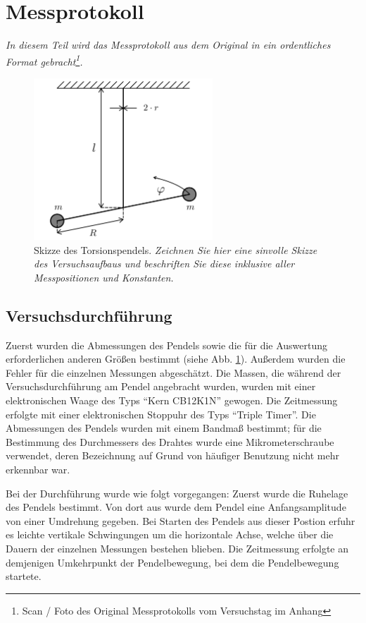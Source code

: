 \section{Messprotokoll}
\textsl{In diesem Teil wird das Messprotokoll aus dem Original in ein ordentliches Format gebracht\footnote{Scan / Foto des Original Messprotokolls vom Versuchstag im Anhang}.}

\begin{figure}
    \centering
    \includegraphics[width=0.6\textwidth]{plots/skizze.png}
    \caption{Skizze des Torsionspendels. \textsl{Zeichnen Sie hier eine sinvolle Skizze des Versuchsaufbaus und beschriften Sie diese inklusive aller Messpositionen und Konstanten.}}
    \label{fig:skizze}
\end{figure}

\subsection{Versuchsdurchführung}
Zuerst wurden die Abmessungen des Pendels sowie die für die Auswertung erforderlichen anderen Größen bestimmt (siehe Abb. \ref{fig:skizze}).
Außerdem wurden die Fehler für die einzelnen Messungen abgeschätzt.
Die Massen, die während der Versuchsdurchführung am Pendel angebracht wurden, wurden mit einer elektronischen Waage des Typs "`Kern CB12K1N"' gewogen.
Die Zeitmessung erfolgte mit einer elektronischen Stoppuhr des Typs "`Triple Timer"'.
Die Abmessungen des Pendels wurden mit einem Bandmaß bestimmt; für die Bestimmung des Durchmessers des Drahtes wurde eine Mikrometerschraube verwendet, deren Bezeichnung auf Grund von häufiger Benutzung nicht mehr erkennbar war. 

Bei der Durchführung wurde wie folgt vorgegangen: Zuerst wurde die Ruhelage des Pendels bestimmt. Von dort aus wurde dem Pendel eine Anfangsamplitude von einer Umdrehung gegeben.
Bei Starten des Pendels aus dieser Postion erfuhr es leichte vertikale Schwingungen um die horizontale Achse, welche über die Dauern der einzelnen Messungen bestehen blieben.
Die Zeitmessung erfolgte an demjenigen Umkehrpunkt der Pendelbewegung, bei dem die Pendelbewegung startete.

